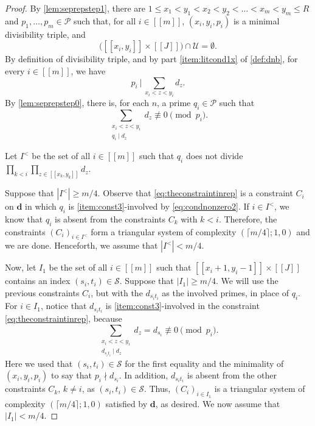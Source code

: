 \documentclass[11pt]{amsart}
\theoremstyle{definition}
\renewcommand{\leq}{\leqslant}
\renewcommand{\geq}{\geqslant}
\newcommand{\interval}[2]{[\![#1,#2]\!] }
\newcommand{\sinterval}[1]{[\![#1]\!] }
\newcommand{\abs}[1]{\left|#1\right|}
\newcommand{\primes}{\mathcal{P}}
\renewcommand{\d}{\boldsymbol{d}}
\newcommand{\pcomp}[2]{d_{#1#2}}
\newcommand{\bmid}{\  \Big\vert}
\newcommand{\unlit}{\mathcal{U}}
\newcommand{\s}{\mathcal{S}}
\newcommand{\newR}{\sinterval{J}}
\newcommand{\mm}{m}
\newcommand{\tupsize}{R}
\newcommand{\thisx}{x}
\newcommand{\thisy}{y}
\begin{document}
\begin{proof}
By \cref{lem:seprepstep1}, there are $1\leq \thisx_1<\thisy_1<\thisx_2<\thisy_2<\ldots <\thisx_\mm<\thisy_\mm \leq \tupsize$ and $p_1, \ldots, p_\mm\in \primes$ such that, for all $i \in \sinterval{\mm}$, $(\thisx_i,\thisy_i,p_i)$ is a minimal divisibility triple, and
\begin{equation}
\label{eq:assumptionnounlit}
	\big(\interval{\thisx_i}{\thisy_i} \times \newR\big) \cap \unlit = \emptyset.
\end{equation}
By definition of divisibility triple, and by part \cref{item:litcond1x} of \cref{def:dnb}, for every $i \in \sinterval{\mm}$, we have
\begin{equation}
\label{eq:theconstraintinrep}
	p_i \bmid\, \sum_{\thisx_i<z<\thisy_i} d_z.
\end{equation}
By \cref{lem:seprepstep0}, there is, for each $n$, a prime $q_i \in \primes$ such that 
\begin{equation}
\label{eq:condnonzero2}
	\sum_{\substack{\thisx_i<z<\thisy_i\\ q_i\mid d_{z}}} d_{z} \not\equiv 0 \pmod {p_i}.
\end{equation}

Let $I^<$ be the set of all $i \in \sinterval{\mm}$ such that $q_i$ does not divide $\prod_{k<i}\prod_{z\in \interval{\thisx_{k}}{\thisy_{k}}}d_z$. 

Suppose that $\abs{I^<}\geq \mm/4$. Observe that \cref{eq:theconstraintinrep} is a constraint $C_i$ on $\d$ in which $q_i$ is \cref{item:const3}-involved by \cref{eq:condnonzero2}. If $i \in I^<$, we know that $q_i$ is absent from the constraints $C_{k}$ with $k<i$. Therefore, the constraints $(C_i)_{i \in I^<}$ form a triangular system of complexity $(\lceil \mm/4 \rceil; 1, 0)$ and we are done. Henceforth, we assume that $\abs{I^<}< \mm/4$.

Now, let $I_1$ be the set of all $i \in \sinterval{\mm}$ such that $\interval{\thisx_i+1}{\thisy_i-1}\times \newR$ contains an index $(s_i, t_i)\in \s$. Suppose that $\abs{I_1}\geq \mm/4$. We will use the previous constraints $C_i$, but with the $\pcomp{s_i}{t_i}$ as the involved primes, in place of $q_i$. For $i \in I_1$, notice that $\pcomp{s_i}{t_i}$ is \cref{item:const3}-involved in the constraint \cref{eq:theconstraintinrep}, because 
\begin{equation}
\label{eq:condnonzero3}
	\sum_{\substack{\thisx_i<z<\thisy_i\\ \pcomp{s_i}{t_i}\mid d_{z}}} d_{z} = d_{s_i} \not\equiv 0 \pmod {p_i}.
\end{equation}
Here we used that $(s_i, t_i)\in \s$ for the first equality and the minimality of $(\thisx_i,\thisy_i,p_i)$ to say that $p_i \nmid d_{s_i}$. In addition, $\pcomp{s_i}{t_i}$ is absent from the other constraints $C_{k}$, $k\neq i$, as $(s_i, t_i)\in \s$. Thus, $(C_i)_{i \in I_1}$ is a triangular system of complexity $(\lceil \mm/4 \rceil; 1, 0)$ satisfied by $\d$, as desired. We now assume that $\abs{I_1} < \mm/4$.


\end{proof}
\end{document}
